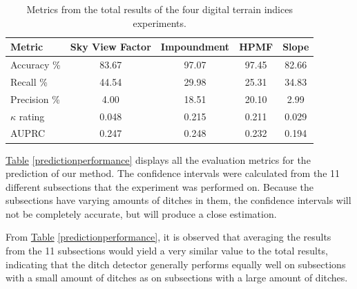\documentclass[11pt, review]{elsarticle} %
\begin{document}
\begin{table}[H]
\centering
    {\begin{tabular}{l|cccc} %
        \textbf{Metric} & \textbf{Sky View Factor} & \textbf{Impoundment} & \textbf{HPMF} & \textbf{Slope}\\ %
        \hline
        Accuracy \%     & 83.67 & 97.07 & 97.45 & 82.66 \\
        Recall \%       & 44.54 & 29.98 & 25.31 & 34.83 \\
        Precision \%    &{ 4.00}  & 18.51 & 20.10 & { 2.99} \\
        $\kappa$ rating & 0.048 & 0.215 & 0.211 & 0.029 \\
        AUPRC & 0.247 & 0.248 & 0.232 & 0.194 \\ %
        \hline
    \end{tabular}}
    \caption{Metrics from the total results of the four digital terrain indices experiments.}
    \label{recreatedpredictionperformance}
\end{table}

\hyperref[predictionperformance]{Table} \ref{predictionperformance} displays all the evaluation metrics for the prediction of our method. The confidence intervals were calculated from the 11 different subsections that the experiment was performed on. Because the subsections have varying amounts of ditches in them, the confidence intervals will not be completely accurate, but will produce a close estimation.

From \hyperref[predictionperformance]{Table} \ref{predictionperformance}, it is observed that averaging the results from the 11 subsections would yield a very similar value to the total results, indicating that the ditch detector generally performs equally well on subsections with a small amount of ditches as on subsections with a large amount of ditches.
\end{document}

